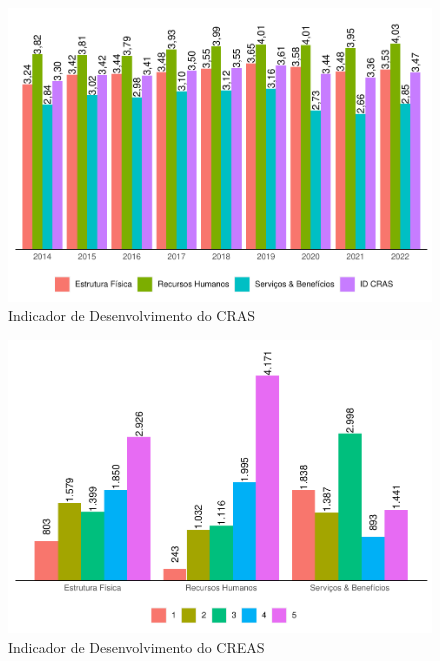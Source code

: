 \documentclass[
  brazilian]{report}
\begin{document}
\begin{figure}
\includegraphics{Censo-SUAS-2022_files/figure-latex/idcras-1} \caption[Indicador de Desenvolvimento do CRAS]{Indicador de Desenvolvimento do CRAS}\label{fig:idcras}
\end{figure}

\begin{figure}
\includegraphics{Censo-SUAS-2022_files/figure-latex/idcras_fis-1} \caption[Indicador de Desenvolvimento do CREAS]{Indicador de Desenvolvimento do CREAS}\label{fig:idcras_fis}
\end{figure}
\end{document}
